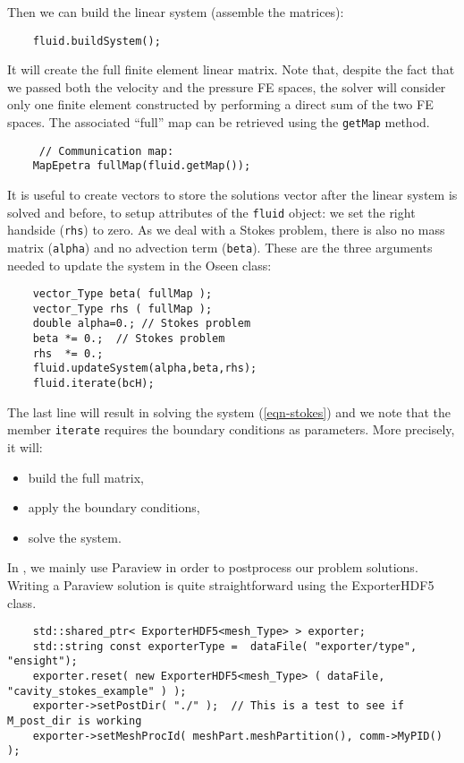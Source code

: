 Then we can build the linear system (assemble the matrices):
\begin{verbatim}
    fluid.buildSystem();
\end{verbatim}

\noindent It will create the full finite element linear matrix. Note that, despite the fact
that we passed both the velocity and the pressure FE spaces, the solver will consider
only one finite element constructed by performing a direct sum of the two FE spaces.
The associated ``full'' map can be retrieved using the \verb|getMap| method. 

\begin{verbatim}
     // Communication map: 
    MapEpetra fullMap(fluid.getMap());
\end{verbatim}
\noindent It is useful to create vectors to store the solutions vector after the linear system is solved and before, to setup attributes of the \verb!fluid! object:  we set the right handside (\verb!rhs!) to zero. As we deal with a Stokes problem, there is also no mass matrix (\verb!alpha!) and no advection term (\verb!beta!). These are the three arguments needed to update the system in the Oseen class:\\

\begin{verbatim}
    vector_Type beta( fullMap );
    vector_Type rhs ( fullMap );
    double alpha=0.; // Stokes problem
    beta *= 0.;  // Stokes problem
    rhs  *= 0.;
    fluid.updateSystem(alpha,beta,rhs);
    fluid.iterate(bcH);
\end{verbatim}

 The last line will result in solving the system (\ref{eqn-stokes}) and we note that the member \verb!iterate! requires the boundary conditions
as parameters. More precisely, it will:
\begin{itemize}
\item build the full matrix,
\item apply the boundary conditions,
\item solve the system.
\end{itemize}

In \lifev, we mainly use Paraview in order to postprocess our problem solutions.
Writing a Paraview solution is quite straightforward using the ExporterHDF5 class.

\begin{verbatim}
    std::shared_ptr< ExporterHDF5<mesh_Type> > exporter;
    std::string const exporterType =  dataFile( "exporter/type", "ensight");
    exporter.reset( new ExporterHDF5<mesh_Type> ( dataFile, "cavity_stokes_example" ) );
    exporter->setPostDir( "./" );  // This is a test to see if M_post_dir is working
    exporter->setMeshProcId( meshPart.meshPartition(), comm->MyPID() );
\end{verbatim}

